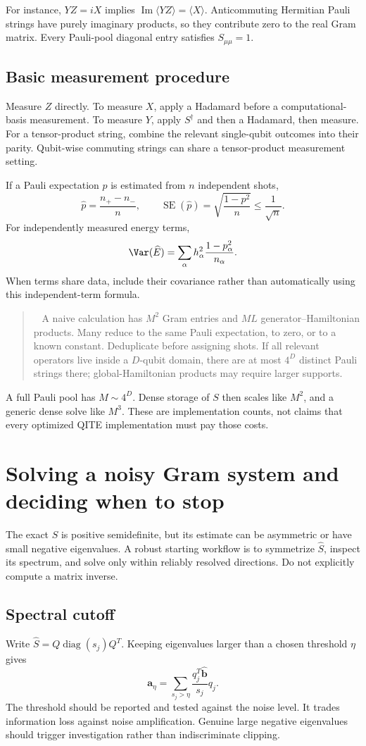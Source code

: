 \documentclass[11pt,a4paper]{article}
\newcommand{\ex}[1]{\langle #1\rangle}
\newcommand{\Ima}{\operatorname{Im}}
\newcommand{\lesson}[2]{\clearpage\section{#1}\label{#2}}
\newenvironment{idea}[1][Main idea]{\par\smallskip\begin{quotation}\noindent{\bfseries\textcolor{keyblue}{#1.}}\ }{\end{quotation}\smallskip}
\begin{document}
For instance, $YZ=iX$ implies $\Ima\ex{YZ}=\ex{X}$. Anticommuting Hermitian Pauli strings have purely imaginary products, so they contribute zero to the real Gram matrix. Every Pauli-pool diagonal entry satisfies $S_{\mu\mu}=1$.

\subsection*{Basic measurement procedure}
Measure $Z$ directly. To measure $X$, apply a Hadamard before a computational-basis measurement. To measure $Y$, apply $S^\dagger$ and then a Hadamard, then measure. For a tensor-product string, combine the relevant single-qubit outcomes into their parity. Qubit-wise commuting strings can share a tensor-product measurement setting.

If a Pauli expectation $p$ is estimated from $n$ independent shots,
\[
\widehat p=\frac{n_+-n_-}{n},\qquad
\operatorname{SE}(\widehat p)=\sqrt{\frac{1-p^2}{n}}\le\frac{1}{\sqrt n}.
\]
For independently measured energy terms,
\[
\Var(\widehat E)=\sum_\alpha h_\alpha^2\frac{1-p_\alpha^2}{n_\alpha}.
\]
When terms share data, include their covariance rather than automatically using this independent-term formula.

\begin{idea}[Matrix entries are not the same as distinct measurements]
A naive calculation has $M^2$ Gram entries and $ML$ generator--Hamiltonian products. Many reduce to the same Pauli expectation, to zero, or to a known constant. Deduplicate before assigning shots. If all relevant operators live inside a $D$-qubit domain, there are at most $4^D$ distinct Pauli strings there; global-Hamiltonian products may require larger supports.
\end{idea}

A full Pauli pool has $M\sim4^D$. Dense storage of $S$ then scales like $M^2$, and a generic dense solve like $M^3$. These are implementation counts, not claims that every optimized QITE implementation must pay those costs.

\lesson{Solving a noisy Gram system and deciding when to stop}{sec:numerics}
The exact $S$ is positive semidefinite, but its estimate can be asymmetric or have small negative eigenvalues. A robust starting workflow is to symmetrize $\widehat S$, inspect its spectrum, and solve only within reliably resolved directions. Do not explicitly compute a matrix inverse.

\subsection*{Spectral cutoff}
Write $\widehat S=Q\operatorname{diag}(s_j)Q^T$. Keeping eigenvalues larger than a chosen threshold $\eta$ gives
\[
\bm a_\eta=\sum_{s_j>\eta}\frac{q_j^T\widehat{\bm b}}{s_j}q_j.
\]
The threshold should be reported and tested against the noise level. It trades information loss against noise amplification. Genuine large negative eigenvalues should trigger investigation rather than indiscriminate clipping.
\end{document}

